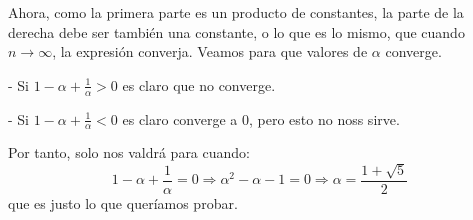 \documentclass[11pt, a4paper]{exam}
\begin{document}
\begin{questions}
\begin{parts}
\begin{solution}
            Ahora, como la primera parte es un producto de constantes, la parte de la derecha debe ser también una constante, o lo que es lo mismo, que cuando $n \rightarrow \infty$, la expresión converja. Veamos para que valores de $\alpha$ converge. 
            
            - Si $1 - \alpha + \frac{1}{\alpha} > 0$ es claro que no converge. 
            
            - Si $1 - \alpha + \frac{1}{\alpha} < 0$ es claro converge a $0$, pero esto no noss sirve. 

            Por tanto, solo nos valdrá para cuando: 
            \begin{equation*}
                1 - \alpha + \frac{1}{\alpha} = 0 \Rightarrow \alpha^2 - \alpha - 1 = 0 \Rightarrow \alpha = \frac{1 + \sqrt5}{2} 
            \end{equation*}
            que es justo lo que queríamos probar.

        \end{solution}
    \end{parts}
\end{questions}



\end{document}
